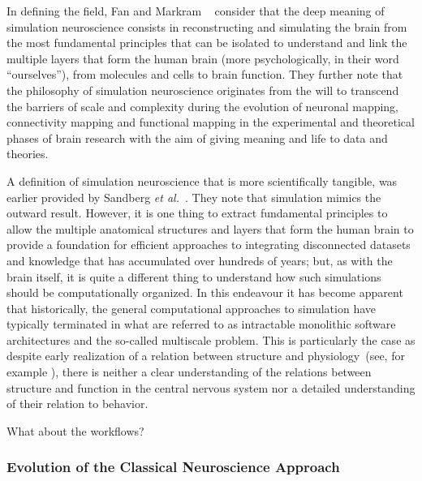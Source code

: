 \documentclass[10pt,letterpaper]{article}
\begin{document}
In defining the field, Fan and Markram ~\cite{fan19} consider that the deep meaning of simulation neuroscience consists in reconstructing and simulating the brain from the most fundamental principles that can be isolated to understand and link the multiple layers that form the human brain (more psychologically, in their word ``ourselves''), from molecules and cells to brain function. They further note that the philosophy of simulation neuroscience originates from the will to transcend the barriers of scale and complexity during the evolution of neuronal mapping, connectivity mapping and functional mapping in the experimental and theoretical phases of brain research with the aim of giving meaning and life to data and theories.

A definition of simulation neuroscience that is more scientifically tangible, was earlier provided by Sandberg {\it{et al}.}~\cite{sandberg08}. They note that simulation mimics the outward result. However, it is one thing to extract fundamental principles to allow the multiple anatomical structures and layers that form the human brain to provide a foundation for efficient approaches to integrating disconnected datasets and knowledge that has accumulated over hundreds of years; but, as with the brain itself, it is quite a different thing to understand how such simulations should be computationally organized. In this endeavour it has become apparent that historically, the general computational approaches to simulation have typically terminated in what are referred to as intractable monolithic software architectures and the so-called multiscale problem.
This is particularly the case as despite early realization of a relation between structure and physiology~(see, for example \cite{sieck17}), there is neither a clear understanding of the relations between structure and function in the central nervous system nor a detailed understanding of their relation to behavior.

What about the workflows?

\subsubsection*{Evolution of the Classical Neuroscience Approach}
\end{document}
